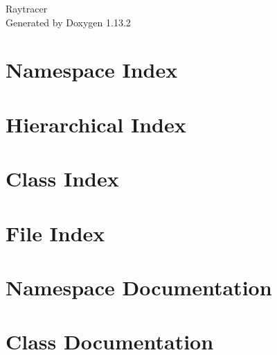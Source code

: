 \documentclass[twoside]{book}
\newcommand{\+}{\discretionary{\mbox{\scriptsize$\hookleftarrow$}}{}{}}
\newcommand{\clearemptydoublepage}{%
    \newpage{\pagestyle{empty}\cleardoublepage}%
  }
\begin{document}
  \raggedbottom
    \hypersetup{pageanchor=false,
                bookmarksnumbered=true,
                pdfencoding=unicode
               }
  \begin{titlepage}
  \vspace*{7cm}
  \begin{center}%
  {\Large Raytracer}\\
  \vspace*{1cm}
  {\large Generated by Doxygen 1.13.2}\\
  \end{center}
  \end{titlepage}
  \clearemptydoublepage
  \tableofcontents
  \clearemptydoublepage
  \hypersetup{pageanchor=true}

\chapter{Namespace Index}

\chapter{Hierarchical Index}

\chapter{Class Index}

\chapter{File Index}

\chapter{Namespace Documentation}

\chapter{Class Documentation}






























\end{document}
